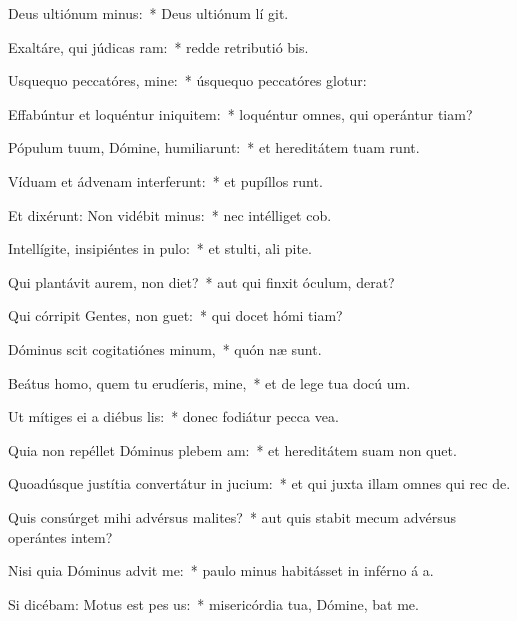\item Deus ultiónum minus:~* Deus ultiónum lí git.
\item Exaltáre, qui júdicas ram:~* redde retributió bis.
\item Usquequo peccatóres, mine:~* úsquequo peccatóres glotur:
\item Effabúntur et loquéntur iniquitem:~* loquéntur omnes, qui operántur tiam?
\item Pópulum tuum, Dómine, humiliarunt:~* et hereditátem tuam runt.
\item Víduam et ádvenam interferunt:~* et pupíllos runt.
\item Et dixérunt: Non vidébit minus:~* nec intélliget  cob.
\item Intellígite, insipiéntes in pulo:~* et stulti, ali pite.
\item Qui plantávit aurem, non diet?~* aut qui finxit óculum,  derat?
\item Qui córripit Gentes, non guet:~* qui docet hómi tiam?
\item Dóminus scit cogitatiónes minum,~* quón næ sunt.
\item Beátus homo, quem tu erudíeris, mine,~* et de lege tua docú um.
\item Ut mítiges ei a diébus lis:~* donec fodiátur pecca vea.
\item Quia non repéllet Dóminus plebem am:~* et hereditátem suam non quet.
\item Quoadúsque justítia convertátur in jucium:~* et qui juxta illam omnes qui rec  de.
\item Quis consúrget mihi advérsus malites?~* aut quis stabit mecum advérsus operántes intem?
\item Nisi quia Dóminus advit me:~* paulo minus habitásset in inférno á a.
\item Si dicébam: Motus est pes us:~* misericórdia tua, Dómine, bat me.
